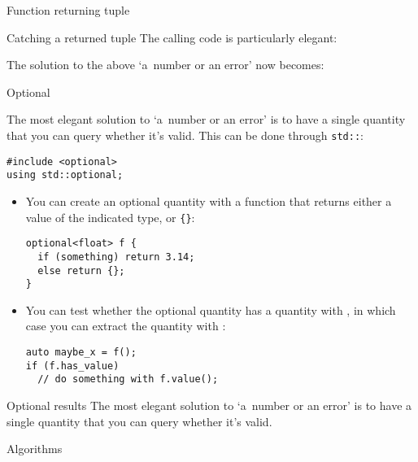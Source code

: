 \begin{slide}{Function returning tuple}
  \label{sl:tuplefun}
  \begin{multicols}{2}
    \columnbreak
  \end{multicols}
\end{slide}

\begin{block}{Catching a returned tuple}
  \label{sl:catch-tuple}
  The calling code is particularly elegant:
\end{block}

The solution to the above `a~number or an error' now becomes:
%

 {Optional}

The most elegant solution to `a~number or an error' is to have a
single quantity that you can query whether it's valid.
This can be done through \lstinline{std::}:
\begin{lstlisting}
#include <optional>
using std::optional;
\end{lstlisting}

\begin{itemize}
\item You can create an optional quantity with a function that returns
  either a value of the indicated type, or \verb+{}+:
\begin{lstlisting}
optional<float> f {
  if (something) return 3.14;
  else return {};
}
\end{lstlisting}
\item You can test whether the optional quantity has a quantity with
  , in which case you can extract the quantity
  with :
\begin{lstlisting}
auto maybe_x = f();
if (f.has_value)
  // do something with f.value();
\end{lstlisting}
\end{itemize}

\begin{slide}{Optional results}
  \label{sl:optional-root}
  The most elegant solution to `a~number or an error' is to have a
  single quantity that you can query whether it's valid.
\end{slide}

 {Algorithms}
\label{sec:algorithm}

